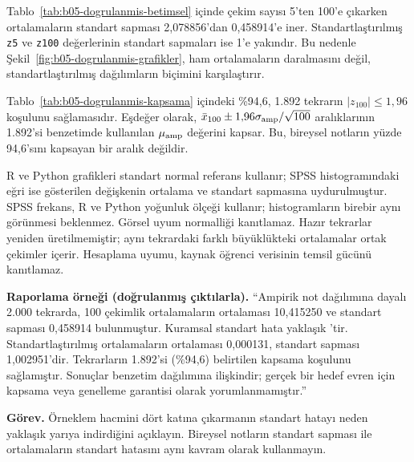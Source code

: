 \begin{outputguidebox}
Tablo~\ref{tab:b05-dogrulanmis-betimsel} içinde çekim sayısı 5'ten
100'e çıkarken ortalamaların standart sapması 2,078856'dan 0,458914'e
iner. Standartlaştırılmış \texttt{z5} ve \texttt{z100} değerlerinin
standart sapmaları ise 1'e yakındır. Bu nedenle
Şekil~\ref{fig:b05-dogrulanmis-grafikler}, ham ortalamaların daralmasını
değil, standartlaştırılmış dağılımların biçimini karşılaştırır.

Tablo~\ref{tab:b05-dogrulanmis-kapsama} içindeki \%94,6, 1.892 tekrarın
$|z_{100}|\leq1{,}96$ koşulunu sağlamasıdır. Eşdeğer olarak,
$\bar{x}_{100}\pm1{,}96\sigma_{\rm amp}/\sqrt{100}$ aralıklarının
1.892'si benzetimde kullanılan $\mu_{\rm amp}$ değerini kapsar.
Bu, bireysel notların yüzde 94,6'sını kapsayan bir aralık değildir.

R ve Python grafikleri standart normal referans kullanır; SPSS
histogramındaki eğri ise gösterilen değişkenin ortalama ve standart
sapmasına uydurulmuştur. SPSS frekans, R ve Python yoğunluk ölçeği
kullanır; histogramların birebir aynı görünmesi beklenmez. Görsel uyum
normalliği kanıtlamaz. Hazır tekrarlar yeniden üretilmemiştir;
aynı tekrardaki farklı büyüklükteki ortalamalar ortak çekimler içerir.
Hesaplama uyumu, kaynak öğrenci verisinin temsil gücünü kanıtlamaz.
\end{outputguidebox}

\textbf{Raporlama örneği (doğrulanmış çıktılarla).}
``Ampirik not dağılımına dayalı 2.000 tekrarda, 100 çekimlik
ortalamaların ortalaması 10,415250 ve standart sapması 0,458914
bulunmuştur. Kuramsal standart hata yaklaşık \SPTheoryHundredSE'tir.
Standartlaştırılmış ortalamaların ortalaması 0,000131, standart sapması
1,002951'dir. Tekrarların 1.892'si (\%94,6) belirtilen kapsama koşulunu
sağlamıştır. Sonuçlar benzetim dağılımına ilişkindir; gerçek bir hedef
evren için kapsama veya genelleme garantisi olarak yorumlanmamıştır.''


\textbf{Görev.} Örneklem hacmini dört katına çıkarmanın standart hatayı
neden yaklaşık yarıya indirdiğini açıklayın. Bireysel notların standart
sapması ile ortalamaların standart hatasını aynı kavram olarak kullanmayın.